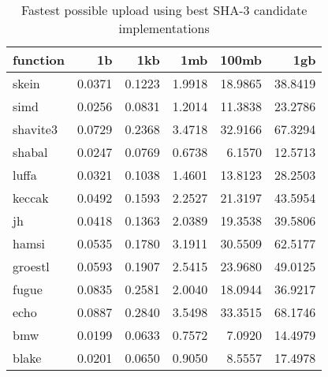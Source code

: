\begin{table} 
  \centering 
    \begin{tabular}{ | l | r | r | r | r | r | }
      \hline
      \textbf{function} & \textbf{1b} & \textbf{1kb} & \textbf{1mb} & \textbf{100mb} & \textbf{1gb} \\ \hline
      skein & 0.0371 & 0.1223 & 1.9918 & 18.9865 & 38.8419 \\ \hline
      simd & 0.0256 & 0.0831 & 1.2014 & 11.3838 & 23.2786 \\ \hline
      shavite3 & 0.0729 & 0.2368 & 3.4718 & 32.9166 & 67.3294 \\ \hline
      shabal & 0.0247 & 0.0769 & 0.6738 & 6.1570 & 12.5713 \\ \hline
      luffa & 0.0321 & 0.1038 & 1.4601 & 13.8123 & 28.2503 \\ \hline
      keccak & 0.0492 & 0.1593 & 2.2527 & 21.3197 & 43.5954 \\ \hline
      jh & 0.0418 & 0.1363 & 2.0389 & 19.3538 & 39.5806 \\ \hline
      hamsi & 0.0535 & 0.1780 & 3.1911 & 30.5509 & 62.5177 \\ \hline
      groestl & 0.0593 & 0.1907 & 2.5415 & 23.9680 & 49.0125 \\ \hline
      fugue & 0.0835 & 0.2581 & 2.0040 & 18.0944 & 36.9217 \\ \hline
      echo & 0.0887 & 0.2840 & 3.5498 & 33.3515 & 68.1746 \\ \hline
      bmw & 0.0199 & 0.0633 & 0.7572 & 7.0920 & 14.4979 \\ \hline
      blake & 0.0201 & 0.0650 & 0.9050 & 8.5557 & 17.4978 \\ \hline
      \end{tabular} 
      \caption{Fastest possible upload using best SHA-3 candidate implementations}
      \label{tbl:tahoe:optimized_p}
\end{table}
